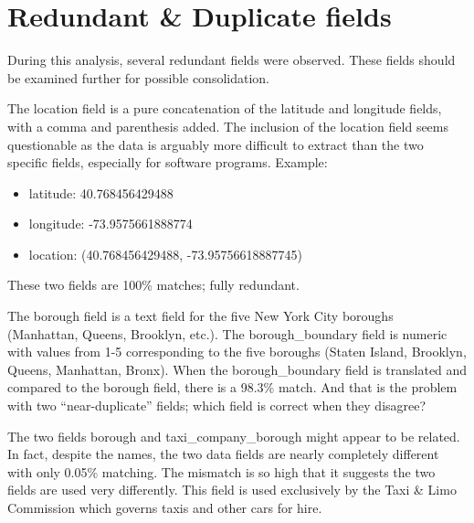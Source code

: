 \documentclass[12pt, titlepage]{article}
\begin{document}
\section{Redundant \& Duplicate fields}\label{sec:duplicates}
During this analysis, several redundant fields were observed. These 
fields should be examined further for possible consolidation.

\label{sec:latlong}
The location field is a pure concatenation of the latitude 
and longitude fields, with a comma and parenthesis 
added. The inclusion of the location field seems questionable 
as the data is arguably more difficult to extract than the 
two specific fields, especially for software programs. Example:  


\begin{itemize}
	\item  latitude: 40.768456429488
	\item  longitude: -73.9575661888774
	\item  location: (40.768456429488, -73.95756618887745)
\end{itemize}


\label{sec:parkborough}
These two fields are 100\% matches; fully redundant.


\label{sec:boroughboundaries}
The borough field is a text field for the five New York City boroughs (Manhattan, Queens, 
Brooklyn, etc.). The borough\_boundary field is numeric with values 
from 1-5 corresponding to the five boroughs (Staten Island, Brooklyn, 
Queens, Manhattan, Bronx). When the borough\_boundary field is 
translated and compared to the borough field, there is a 
98.3\% match. And that is the problem with two ``near-duplicate'' 
fields; which field is correct when they disagree?


\label{sec:taxicompanyborough}
The two fields borough and taxi\_company\_borough might appear to be 
related. In fact, despite the names, the two data fields are nearly 
completely different with only 0.05\% matching. The mismatch is so 
high that it suggests the two fields are used very differently. This field 
is used exclusively by the Taxi \& Limo Commission which governs 
taxis and other cars for hire.
\end{document}
